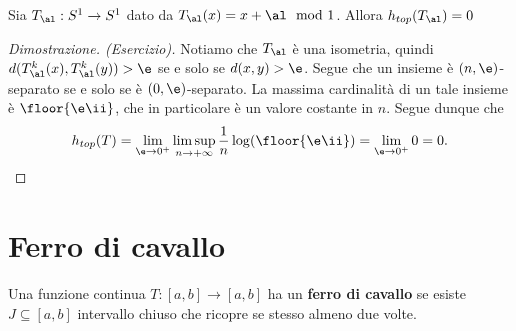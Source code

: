 \begin{proposition}
Sia $T_\al:S^1\to S^1$ dato da $T_\al(x)=x+\al\mod 1$. Allora $h_{top}(T_\al)=0$
\end{proposition}
\begin{proof}[Dimostrazione. (Esercizio)]
Notiamo che $T_\al$ \`e una isometria, quindi $d(T_\al^k(x),T^k_\al(y))>\e$ se e solo se $d(x,y)>\e$. Segue che un insieme \`e $(n,\e)$-separato se e solo se \`e $(0,\e)$-separato. La massima cardinalit\`a di un tale insieme \`e $\floor{\e\ii}$, che in particolare \`e un valore costante in $n$. Segue dunque che
\[h_{top}(T)=\lim_{\e\to0^+}\limsup_{n\to+\infty}\frac1n\log(\floor{\e\ii})=\lim_{\e\to0^+}0=0.\]
\end{proof}

\section{Ferro di cavallo}
\begin{definition}
Una funzione continua $T:[a,b]\to[a,b]$ ha un \textbf{ferro di cavallo} se esiste $J\subseteq [a,b]$ intervallo chiuso che ricopre se stesso almeno due volte.
\end{definition}

